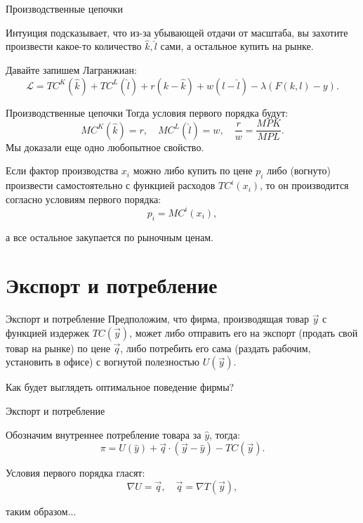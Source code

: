 \documentclass{beamer}
\begin{document}
\begin{frame}{Производственные цепочки}

Интуиция подсказывает, что из-за убывающей отдачи от масштаба, вы захотите произвести какое-то количество $\hat k, \hat l$ сами, а остальное купить на рынке. 

Давайте запишем Лагранжиан:
$$
\mathcal{L} = TC^K(\hat k) + TC^L(\hat l) + r(k-\hat k) + w(l - \hat l) - \lambda (F(k,l) - y).
$$

\end{frame}

\begin{frame}{Производственные цепочки}
Тогда условия первого порядка будут:
$$ MC^K(\hat k) = r, \quad MC^L(\hat l) = w, \quad \frac{r}{w} = \frac{MPK}{MPL}.$$
Мы доказали еще одно любопытное свойство.

\begin{lemma}
Если фактор производства $x_i$ можно либо купить по цене $p_i$ либо (вогнуто) произвести самостоятельно с функцией расходов $TC^i(x_i)$, то он производится согласно условиям первого порядка:
$$ p_i = MC^i(x_i),$$

а все остальное закупается по рыночным ценам.
\end{lemma}
\end{frame}

\section{Экспорт и потребление}

\begin{frame}{Экспорт и потребление}
Предположим, что фирма, производящая товар $\vec y$ с функцией издержек $TC(\vec y)$, может либо отправить его на экспорт (продать свой товар на рынке) по цене $\vec q$, либо потребить его сама (раздать рабочим, установить в офисе) с вогнутой полезностью $U(\vec y)$. 

Как будет выглядеть оптимальное поведение фирмы?
\end{frame}

\begin{frame}{Экспорт и потребление}

Обозначим внутреннее потребление товара за $\hat y$, тогда:
$$ \pi = U(\hat y) + \vec q \cdot (\vec y - \hat y) - TC(\vec y).$$

Условия первого порядка гласят:
$$ \nabla U = \vec q, \quad \vec q = \nabla T(\vec y),$$

таким образом...
\end{frame}
\end{document}
